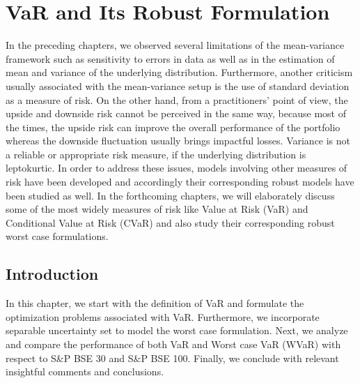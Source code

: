 \chapter{VaR and Its Robust Formulation}

In the preceding chapters, we observed several limitations of the mean-variance framework such as sensitivity to errors in data as well as in the estimation of mean and variance of the underlying distribution. Furthermore, another criticism usually associated with the mean-variance setup is the use of standard deviation as a measure of risk. On the other hand, from a practitioners' point of view, the upside and downside risk cannot be perceived in the same way, because most of the times, the upside risk can improve the overall performance of the portfolio whereas the downside fluctuation usually brings impactful losses. Variance is not a reliable or appropriate  risk measure, if the underlying distribution is leptokurtic. In order to address these issues, models involving other measures of risk have been developed and accordingly their corresponding robust models have been studied as well. In the forthcoming chapters, we will elaborately discuss some of the most widely measures of risk like Value at Risk (VaR) and Conditional Value at Risk (CVaR) and also study their corresponding robust worst case formulations. 

\section{Introduction}
In this chapter, we start with the definition of VaR and formulate the optimization problems associated with VaR. Furthermore, we incorporate separable uncertainty set to model the worst case formulation. Next, we analyze and compare the performance of both VaR and Worst case VaR (WVaR) with respect to S\&P BSE 30 and S\&P BSE 100. Finally, we conclude with relevant insightful comments and conclusions.


